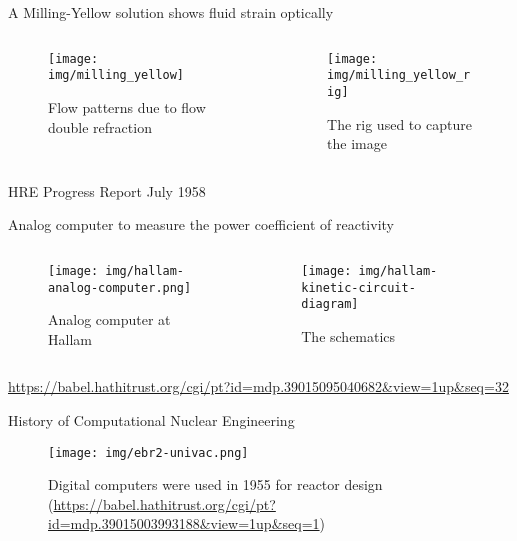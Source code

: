 \documentclass[pdf,aspectratio=169]{beamer}
\begin{document}
\begin{frame}{A Milling-Yellow solution shows fluid strain optically}
\begin{columns}
    \begin{column}{0.5\textwidth}
        \begin{figure}[ht]
        \centering
        \texttt{[image: img/milling\_yellow]}
            \caption{\small Flow patterns due to flow double refraction}
        \end{figure}
    \end{column}
    \begin{column}{0.5\textwidth}
        \begin{figure}[ht]
        \centering
        \texttt{[image: img/milling\_yellow\_rig]}
            \caption{\small The rig used to capture the image}
        \end{figure}
    \end{column}
\end{columns}
    \centering \tiny HRE Progress Report July 1958
\end{frame}

\begin{frame}{Analog computer to measure the power coefficient of reactivity}
\begin{columns}
    \begin{column}{0.5\textwidth}
        \begin{figure}[ht]
        \centering
        \texttt{[image: img/hallam-analog-computer.png]}
        \caption{\small Analog computer at Hallam}
        \end{figure}
    \end{column}
    \begin{column}{0.5\textwidth}
        \begin{figure}[ht]
        \centering
        \texttt{[image: img/hallam-kinetic-circuit-diagram]}
        \caption{\small The schematics}
        \end{figure}
    \end{column}
\end{columns}
    \centering \tiny \url{https://babel.hathitrust.org/cgi/pt?id=mdp.39015095040682&view=1up&seq=32}
\end{frame}

\begin{frame}{History of Computational Nuclear Engineering}
        \begin{figure}[ht]
        \centering
            \texttt{[image: img/ebr2-univac.png]}
    \caption{\small Digital computers were used in 1955 for reactor design
            (\url{https://babel.hathitrust.org/cgi/pt?id=mdp.39015003993188&view=1up&seq=1})}
        \end{figure}
\end{frame}
\end{document}
